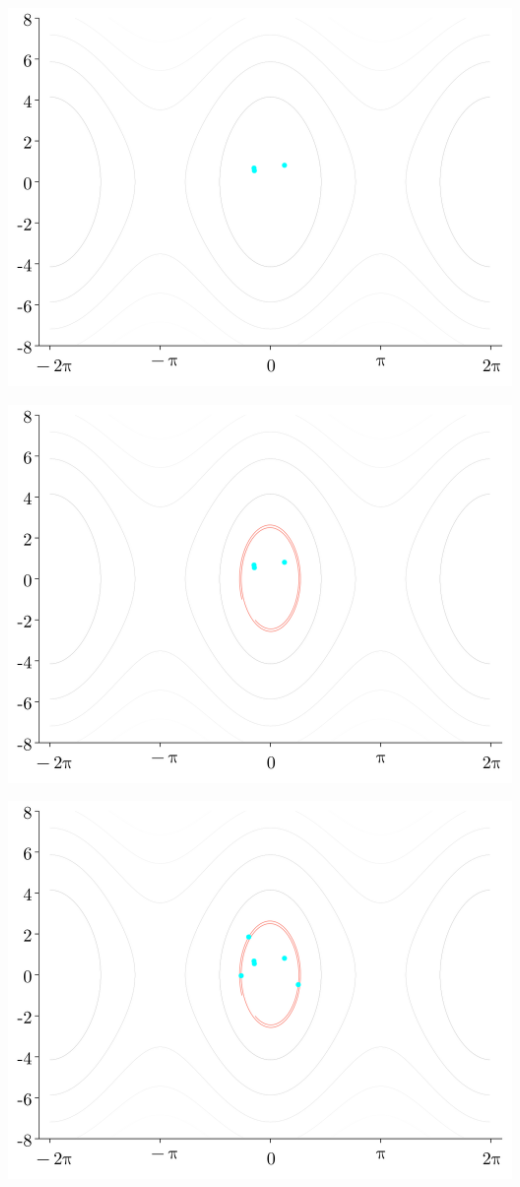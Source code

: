 \documentclass[
]{report}
\begin{document}
\includegraphics{contents/assets/neuralpbc/003.svg}

\includegraphics{contents/assets/neuralpbc/004.svg}

\includegraphics{contents/assets/neuralpbc/005.svg}
\end{document}
